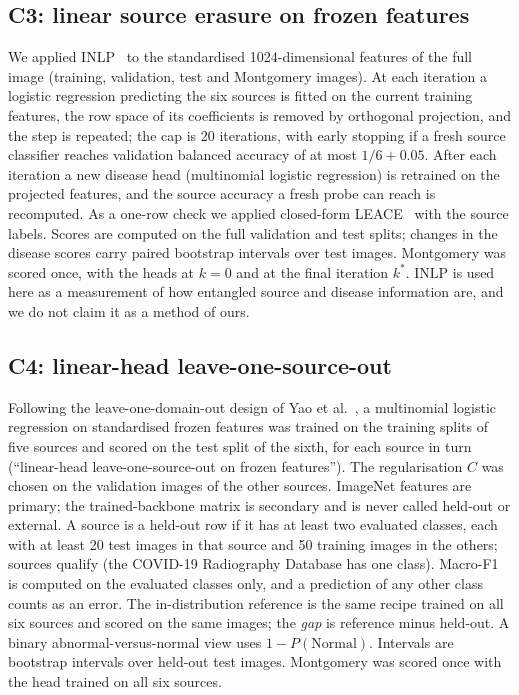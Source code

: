 \subsection{C3: linear source erasure on frozen features}
\label{sec:meth-c3}
We applied INLP~\cite{ravfogel2020null} to the standardised 1024-dimensional features of the full image (training, validation, test and Montgomery images). At each iteration a logistic regression predicting the six sources is fitted on the current training features, the row space of its coefficients is removed by orthogonal projection, and the step is repeated; the cap is 20 iterations, with early stopping if a fresh source classifier reaches validation balanced accuracy of at most $1/6+0.05$. After each iteration a new disease head (multinomial logistic regression) is retrained on the projected features, and the source accuracy a fresh probe can reach is recomputed. As a one-row check we applied closed-form LEACE~\cite{belrose2023leace} with the source labels. Scores are computed on the full validation and test splits; changes in the disease scores carry paired bootstrap intervals over test images. Montgomery was scored once, with the heads at $k=0$ and at the final iteration $k^\ast$. INLP is used here as a measurement of how entangled source and disease information are, and we do not claim it as a method of ours.

\subsection{C4: linear-head leave-one-source-out}
\label{sec:meth-c4}
Following the leave-one-domain-out design of Yao et al.~\cite{yao2019strong}, a multinomial logistic regression on standardised frozen features was trained on the training splits of five sources and scored on the test split of the sixth, for each source in turn (``linear-head leave-one-source-out on frozen features''). The regularisation $C$ was chosen on the validation images of the other sources. ImageNet features are primary; the trained-backbone matrix is secondary and is never called held-out or external. A source is a held-out row if it has at least two evaluated classes, each with at least 20 test images in that source and 50 training images in the others; \RLosoImgNIncluded{} sources qualify (the COVID-19 Radiography Database has one class). Macro-F1 is computed on the evaluated classes only, and a prediction of any other class counts as an error. The in-distribution reference is the same recipe trained on all six sources and scored on the same images; the \emph{gap} is reference minus held-out. A binary abnormal-versus-normal view uses $1-P(\text{Normal})$. Intervals are bootstrap intervals over held-out test images. Montgomery was scored once with the head trained on all six sources.

